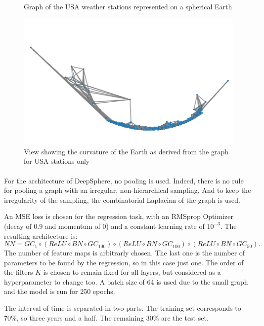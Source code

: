 \documentclass[11pt]{report}
\begin{document}
\begin{figure}[!ht]
\begin{minipage}{0.4\linewidth}
    \caption{Graph of the USA weather stations represented on a spherical Earth}
    \label{fig:USA_graph_sphere}
\end{minipage}
\hfill
\begin{minipage}{0.48\linewidth}
    \centering
    \includegraphics[width=0.99\linewidth]{USA_temp_3.png}
    \caption{View showing the curvature of the Earth as derived from the graph for USA stations only}
    \label{fig:USA_graph_up}
\end{minipage}
\end{figure}


\paragraph*{}
For the architecture of DeepSphere, no pooling is used. Indeed, there is no rule for pooling a graph with an irregular, non-hierarchical sampling. And to keep the irregularity of the sampling, the combinatorial Laplacian of the graph is used.

An MSE loss is chosen for the regression task, with an RMSprop Optimizer (decay of 0.9 and momentum of 0) and a constant learning rate of $10^{-3}$.
The resulting architecture is:
$$ NN = GC_1 \circ (ReLU \circ BN \circ GC_{100}) \circ (ReLU \circ BN \circ GC_{100}) \circ (ReLU \circ BN \circ GC_{50}). $$
The number of feature maps is arbitrarly chosen. The last one is the number of parameters to be found by the regression, so in this case just one. The order of the filters $K$ is chosen to remain fixed for all layers, but considered as a hyperparameter to change too.
A batch size of 64 is used due to the small graph and the model is run for 250 epochs.

The interval of time is separated in two parts. The training set corresponds to 70\%, so three years and a half. The remaining 30\% are the test set.
\end{document}
